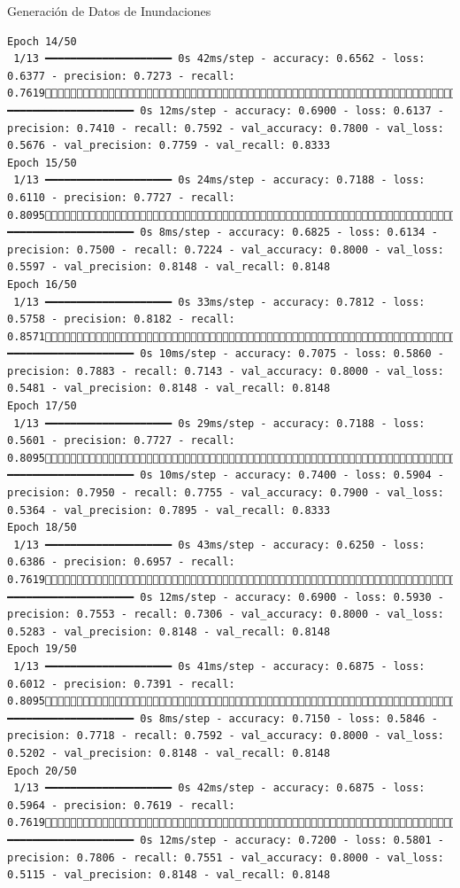 \documentclass[
  ignorenonframetext,
]{beamer}
\begin{document}
\begin{frame}[fragile]{Generación de Datos de Inundaciones}
\begin{verbatim}
Epoch 14/50
 1/13 ━━━━━━━━━━━━━━━━━━━━ 0s 42ms/step - accuracy: 0.6562 - loss: 0.6377 - precision: 0.7273 - recall: 0.761913/13 ━━━━━━━━━━━━━━━━━━━━ 0s 12ms/step - accuracy: 0.6900 - loss: 0.6137 - precision: 0.7410 - recall: 0.7592 - val_accuracy: 0.7800 - val_loss: 0.5676 - val_precision: 0.7759 - val_recall: 0.8333
Epoch 15/50
 1/13 ━━━━━━━━━━━━━━━━━━━━ 0s 24ms/step - accuracy: 0.7188 - loss: 0.6110 - precision: 0.7727 - recall: 0.809513/13 ━━━━━━━━━━━━━━━━━━━━ 0s 8ms/step - accuracy: 0.6825 - loss: 0.6134 - precision: 0.7500 - recall: 0.7224 - val_accuracy: 0.8000 - val_loss: 0.5597 - val_precision: 0.8148 - val_recall: 0.8148
Epoch 16/50
 1/13 ━━━━━━━━━━━━━━━━━━━━ 0s 33ms/step - accuracy: 0.7812 - loss: 0.5758 - precision: 0.8182 - recall: 0.857113/13 ━━━━━━━━━━━━━━━━━━━━ 0s 10ms/step - accuracy: 0.7075 - loss: 0.5860 - precision: 0.7883 - recall: 0.7143 - val_accuracy: 0.8000 - val_loss: 0.5481 - val_precision: 0.8148 - val_recall: 0.8148
Epoch 17/50
 1/13 ━━━━━━━━━━━━━━━━━━━━ 0s 29ms/step - accuracy: 0.7188 - loss: 0.5601 - precision: 0.7727 - recall: 0.809513/13 ━━━━━━━━━━━━━━━━━━━━ 0s 10ms/step - accuracy: 0.7400 - loss: 0.5904 - precision: 0.7950 - recall: 0.7755 - val_accuracy: 0.7900 - val_loss: 0.5364 - val_precision: 0.7895 - val_recall: 0.8333
Epoch 18/50
 1/13 ━━━━━━━━━━━━━━━━━━━━ 0s 43ms/step - accuracy: 0.6250 - loss: 0.6386 - precision: 0.6957 - recall: 0.761913/13 ━━━━━━━━━━━━━━━━━━━━ 0s 12ms/step - accuracy: 0.6900 - loss: 0.5930 - precision: 0.7553 - recall: 0.7306 - val_accuracy: 0.8000 - val_loss: 0.5283 - val_precision: 0.8148 - val_recall: 0.8148
Epoch 19/50
 1/13 ━━━━━━━━━━━━━━━━━━━━ 0s 41ms/step - accuracy: 0.6875 - loss: 0.6012 - precision: 0.7391 - recall: 0.809513/13 ━━━━━━━━━━━━━━━━━━━━ 0s 8ms/step - accuracy: 0.7150 - loss: 0.5846 - precision: 0.7718 - recall: 0.7592 - val_accuracy: 0.8000 - val_loss: 0.5202 - val_precision: 0.8148 - val_recall: 0.8148
Epoch 20/50
 1/13 ━━━━━━━━━━━━━━━━━━━━ 0s 42ms/step - accuracy: 0.6875 - loss: 0.5964 - precision: 0.7619 - recall: 0.761913/13 ━━━━━━━━━━━━━━━━━━━━ 0s 12ms/step - accuracy: 0.7200 - loss: 0.5801 - precision: 0.7806 - recall: 0.7551 - val_accuracy: 0.8000 - val_loss: 0.5115 - val_precision: 0.8148 - val_recall: 0.8148

\end{verbatim}
\end{frame}
\end{document}
